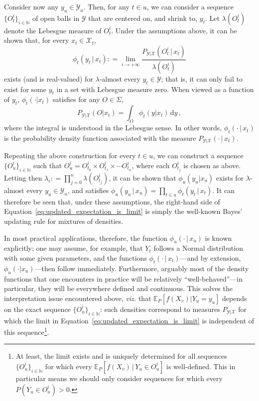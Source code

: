 \documentclass[twoside,11pt]{article}
\newcommand{\nats}{\mathbb{N}}
\newcommand{\states}{\mathcal{X}}
\newcommand{\observs}{\mathcal{Y}}
\newcommand{\coloneqq}{:\!=}
\begin{document}
Consider now any $y_u\in\observs_u$. Then, for any $t\in u$, we can consider a sequence $\{O_t^i\}_{i\in\nats}$ of open balls in $\observs$ that are centered on, and shrink to, $y_t$. Let $\lambda(O_t^i)$ denote the Lebesgue measure of $O_t^i$. Under the assumptions above, it can be shown that, for every $x_t\in\states_t$,
\begin{equation}\label{eq:density_is_limit}
\phi_t(y_t\,\vert\,x_t) \coloneqq \lim_{i\to+\infty} \frac{P_{\observs\vert\states}(O_t^i\,\vert\,x_t)}{\lambda(O_t^i)}
\end{equation}
exists (and is real-valued) for $\lambda$-almost every $y_t\in\observs$; that is, it can only fail to exist for some $y_t$ in a set with Lebesgue measure zero. When viewed as a function of $y_t$, $\phi_t(\cdot\vert x_t)$ satisfies for any $O\in\Sigma$,
\begin{equation}\label{eq:density_generates_measure}
P_{\observs\vert\states}(O\vert x_t) = \int_{O}\phi_t(y\vert x_t) \,\mathrm{d}y\,,
\end{equation}
where the integral is understood in the Lebesgue sense. In other words, $\phi_t(\cdot\,\vert\,x_t)$ is the probability density function associated with the measure $P_{\observs\vert\states}(\cdot\,\vert\, x_t)$.

Repeating the above construction for every $t\in u$, we can construct a sequence $\{O_u^i\}_{i\in\nats}$ such that $O_u^i=O_{t_0}^i\times O_{t_1}^i\times\cdots O_{t_n}^i$, where each $O_{t_j}^i$ is chosen as above. Letting then $\lambda_i\coloneqq \prod_{j=0}^n\lambda(O_{t_j}^i)$, it can be shown that $\phi_u(y_u\vert x_u)$ exists for $\lambda$-almost every $y_u\in\observs_u$, and satisfies $\phi_u(y_u\,\vert\,x_u) = \prod_{t\in u} \phi_t(y_t\,\vert\,x_t)$.
It can therefore be seen that, under these assumptions, the right-hand side of Equation~\eqref{eq:updated_expectation_is_limit} is simply the well-known Bayes' updating rule for mixtures of densities. 

In most practical applications, therefore, the function $\phi_u(\cdot\,\vert\,x_u)$ is known explicitly; one may assume, for example, that $Y_t$ follows a Normal distribution with some given parameters, and the functions $\phi_t(\cdot\,\vert\,x_t)$---and by extension, $\phi_u(\cdot\vert x_u)$---then follow immediately. Furthermore, arguably most of the density functions that one encounters in practice will be relatively ``well-behaved''---in particular, they will be everywhere defined and continuous. This solves the interpretation issue encountered above, \emph{viz.} that $\mathbb{E}_P[f(X_v)\vert Y_u=y_u]$ depends on the exact sequence $\{O_u^i\}_{i\in\nats}$: such densities correspond to measures $P_{\observs\vert\states}$ for which the limit in Equation~\eqref{eq:updated_expectation_is_limit} is independent of this sequence\footnote{\label{fnote:extra_condition}At least, the limit exists and is uniquely determined for all sequences $\{O_u^i\}_{i\in\nats}$ for which every $\mathbb{E}_P[f(X_v)\,\vert\,Y_u\in O_u^i]$ is well-defined. This in particular means we should only consider sequences for which every $P(Y_u\in O_u^i)>0$.}.
\end{document}
